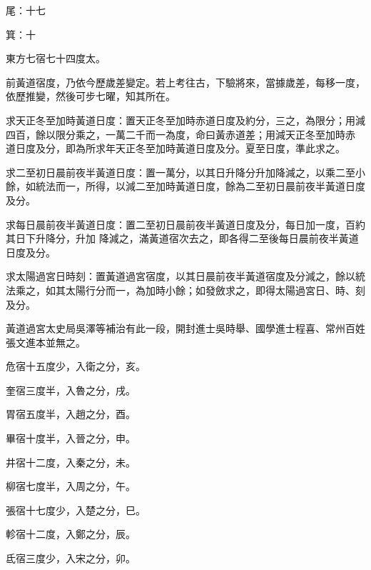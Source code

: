 \begin{pinyinscope}
 尾：十七



 箕：十



 東方七宿七十四度太。



 前黃道宿度，乃依今歷歲差變定。若上考往古，下驗將來，當據歲差，每移一度，依歷推變，然後可步七曜，知其所在。



 求天正冬至加時黃道日度：置天正冬至加時赤道日度及約分，三之，為限分；用減四百，餘以限分乘之，一萬二千而一為度，命曰黃赤道差；用減天正冬至加時赤
 道日度及分，即為所求年天正冬至加時黃道日度及分。夏至日度，準此求之。



 求二至初日晨前夜半黃道日度：置一萬分，以其日升降分升加降減之，以乘二至小餘，如統法而一，所得，以減二至加時黃道日度，餘為二至初日晨前夜半黃道日度及分。



 求每日晨前夜半黃道日度：置二至初日晨前夜半黃道日度及分，每日加一度，百約其日下升降分，升加
 降減之，滿黃道宿次去之，即各得二至後每日晨前夜半黃道日度及分。



 求太陽過宮日時刻：置黃道過宮宿度，以其日晨前夜半黃道宿度及分減之，餘以統法乘之，如其太陽行分而一，為加時小餘；如發斂求之，即得太陽過宮日、時、刻及分。



 黃道過宮太史局吳澤等補治有此一段，開封進士吳時舉、國學進士程喜、常州百姓張文進本並無之。



 危宿十五度少，入衛之分，亥。



 奎宿三度半，入魯之分，戌。



 胃宿五度半，入趙之分，酉。



 畢宿十度半，入晉之分，申。



 井宿十二度，入秦之分，未。



 柳宿七度半，入周之分，午。



 張宿十七度少，入楚之分，巳。



 軫宿十二度，入鄭之分，辰。



 氐宿三度少，入宋之分，卯。




\end{pinyinscope}
